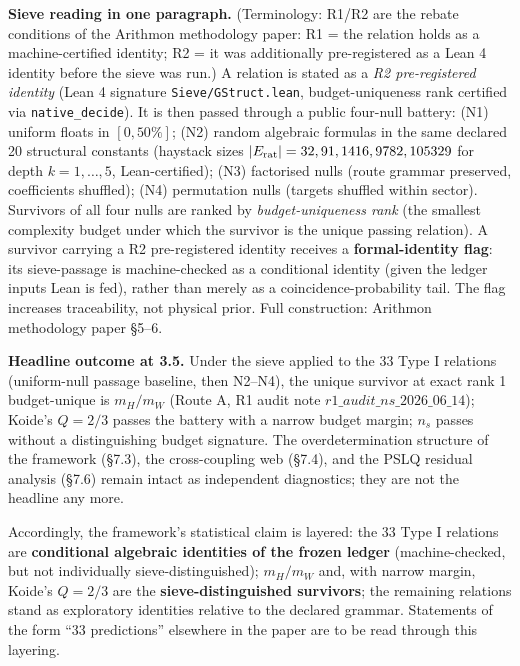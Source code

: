 \documentclass[11pt,a4paper]{article}
\begin{document}
\textbf{Sieve reading in one paragraph.} (Terminology: R1/R2 are the rebate conditions of the Arithmon methodology paper: R1 = the relation holds as a machine-certified identity; R2 = it was additionally pre-registered as a Lean 4 identity before the sieve was run.) A relation is stated as a \emph{R2 pre-registered identity} (Lean 4 signature \texttt{Sieve/\allowbreak{}GStruct.\allowbreak{}lean}, budget-uniqueness rank certified via \texttt{native\_\allowbreak{}decide}). It is then passed through a public four-null battery: (N1) uniform floats in \([0, 50\%]\); (N2) random algebraic formulas in the same declared 20 structural constants (haystack sizes \(|E_{\rm rat}| = 32, 91, 1416, 9782, 105329\) for depth \(k = 1, \ldots, 5\), Lean-certified); (N3) factorised nulls (route grammar preserved, coefficients shuffled); (N4) permutation nulls (targets shuffled within sector). Survivors of all four nulls are ranked by \emph{budget-uniqueness rank} (the smallest complexity budget under which the survivor is the unique passing relation). A survivor carrying a R2 pre-registered identity receives a \textbf{formal-identity flag}: its sieve-passage is machine-checked as a conditional identity (given the ledger inputs Lean is fed), rather than merely as a coincidence-probability tail. The flag increases traceability, not physical prior. Full construction: Arithmon methodology paper §5--6.

\textbf{Headline outcome at 3.5.} Under the sieve applied to the 33 Type I relations (uniform-null passage baseline, then N2--N4), the unique survivor at exact rank 1 budget-unique is \(m_H/m_W\) (Route A, R1 audit note \(r1\_\allowbreak{}audit\_\allowbreak{}ns\_\allowbreak{}2026\_\allowbreak{}06\_\allowbreak{}14\)); Koide's \(Q = 2/3\) passes the battery with a narrow budget margin; \(n_s\) passes without a distinguishing budget signature. The overdetermination structure of the framework (§7.3), the cross-coupling web (§7.4), and the PSLQ residual analysis (§7.6) remain intact as independent diagnostics; they are not the headline any more.

Accordingly, the framework's statistical claim is layered: the 33 Type I relations are \textbf{conditional algebraic identities of the frozen ledger} (machine-checked, but not individually sieve-distinguished); \(m_H/m_W\) and, with narrow margin, Koide's \(Q = 2/3\) are the \textbf{sieve-distinguished survivors}; the remaining relations stand as exploratory identities relative to the declared grammar. Statements of the form ``33 predictions'' elsewhere in the paper are to be read through this layering.
\end{document}
